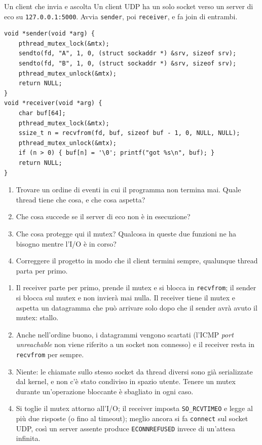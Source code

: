 \begin{esercizio}{Un client che invia e ascolta}
Un client UDP ha un solo socket verso un server di eco su \texttt{127.0.0.1:5000}. Avvia \texttt{sender}, poi \texttt{receiver}, e fa join
di entrambi.
\begin{lstlisting}[language={[POSIX]C}]
void *sender(void *arg) {
    pthread_mutex_lock(&mtx);
    sendto(fd, "A", 1, 0, (struct sockaddr *) &srv, sizeof srv);
    sendto(fd, "B", 1, 0, (struct sockaddr *) &srv, sizeof srv);
    pthread_mutex_unlock(&mtx);
    return NULL;
}
void *receiver(void *arg) {
    char buf[64];
    pthread_mutex_lock(&mtx);
    ssize_t n = recvfrom(fd, buf, sizeof buf - 1, 0, NULL, NULL);
    pthread_mutex_unlock(&mtx);
    if (n > 0) { buf[n] = '\0'; printf("got %s\n", buf); }
    return NULL;
}
\end{lstlisting}
\begin{enumerate}[label=(\alph*)]
    \item Trovare un ordine di eventi in cui il programma non termina mai. Quale thread tiene che cosa, e che cosa aspetta?
    \item Che cosa succede se il server di eco non è in esecuzione?
    \item Che cosa protegge qui il mutex? Qualcosa in queste due funzioni ne ha bisogno mentre l'I/O è in corso?
    \item Correggere il progetto in modo che il client termini sempre, qualunque thread parta per primo.
\end{enumerate}

\svolgimento
\begin{enumerate}[label=(\alph*)]
    \item Il receiver parte per primo, prende il mutex e si blocca in \texttt{recvfrom}; il sender si blocca sul mutex e non invierà mai
          nulla. Il receiver tiene il mutex e aspetta un datagramma che può arrivare solo dopo che il sender avrà avuto il mutex: stallo.
    \item Anche nell'ordine buono, i datagrammi vengono scartati (l'ICMP \emph{port unreachable} non viene riferito a un socket non
          connesso) e il receiver resta in \texttt{recvfrom} per sempre.
    \item Niente: le chiamate sullo stesso socket da thread diversi sono già serializzate dal kernel, e non c'è stato condiviso in spazio
          utente. Tenere un mutex durante un'operazione bloccante è sbagliato in ogni caso.
    \item Si toglie il mutex attorno all'I/O; il receiver imposta \texttt{SO\_RCVTIMEO} e legge al più due risposte (o fino al timeout);
          meglio ancora si fa \texttt{connect} sul socket UDP, così un server assente produce \texttt{ECONNREFUSED} invece di un'attesa
          infinita.
\end{enumerate}
\end{esercizio}

